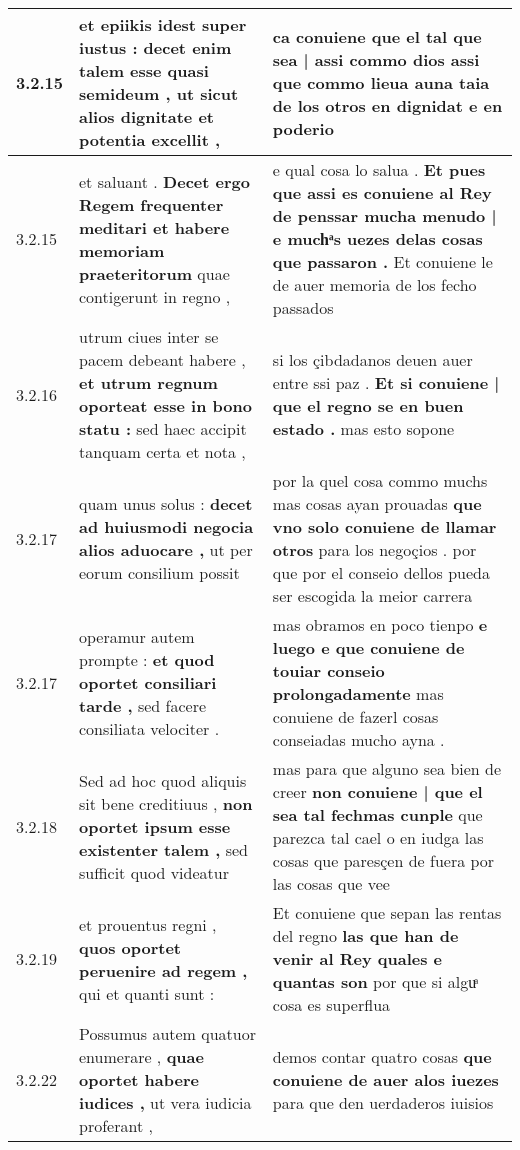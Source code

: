 \begin{tabular}{|p{1cm}|p{6.5cm}|p{6.5cm}|}
3.2.15 & et epiikis idest super iustus : \textbf{ decet enim talem esse quasi semideum , } ut sicut alios dignitate et potentia excellit , & ca conuiene \textbf{ que el tal que sea | assi commo dios } assi que commo lieua auna taia de los otros en dignidat e en poderio \\\hline
3.2.15 & et saluant . \textbf{ Decet ergo Regem frequenter meditari et habere memoriam praeteritorum } quae contigerunt in regno , & e qual cosa lo salua . \textbf{ Et pues que assi es conuiene al Rey de penssar mucha menudo | e muchͣs uezes delas cosas que passaron . } Et conuiene le de auer memoria de los fecho passados \\\hline
3.2.16 & utrum ciues inter se pacem debeant habere , \textbf{ et utrum regnum oporteat esse in bono statu : } sed haec accipit tanquam certa et nota , & si los çibdadanos deuen auer entre ssi paz . \textbf{ Et si conuiene | que el regno se en buen estado . } mas esto sopone \\\hline
3.2.17 & quam unus solus : \textbf{ decet ad huiusmodi negocia alios aduocare , } ut per eorum consilium possit & por la quel cosa commo muchs mas cosas ayan prouadas \textbf{ que vno solo conuiene de llamar otros } para los negoçios . por que por el conseio dellos pueda ser escogida la meior carrera \\\hline
3.2.17 & operamur autem prompte : \textbf{ et quod oportet consiliari tarde , } sed facere consiliata velociter . & mas obramos en poco tienpo \textbf{ e luego e que conuiene de touiar conseio prolongadamente } mas conuiene de fazerl cosas conseiadas mucho ayna . \\\hline
3.2.18 & Sed ad hoc quod aliquis sit bene creditiuus , \textbf{ non oportet ipsum esse existenter talem , } sed sufficit quod videatur & mas para que alguno sea bien de creer \textbf{ non conuiene | que el sea tal fechmas cunple } que parezca tal cael o en iudga las cosas que paresçen de fuera por las cosas que vee \\\hline
3.2.19 & et prouentus regni , \textbf{ quos oportet peruenire ad regem , } qui et quanti sunt : & Et conuiene que sepan las rentas del regno \textbf{ las que han de venir al Rey quales e quantas son } por que si alguͣ cosa es superflua \\\hline
3.2.22 & Possumus autem quatuor enumerare , \textbf{ quae oportet habere iudices , } ut vera iudicia proferant , & demos contar quatro cosas \textbf{ que conuiene de auer alos iuezes } para que den uerdaderos iuisios \\\hline

\end{tabular}
